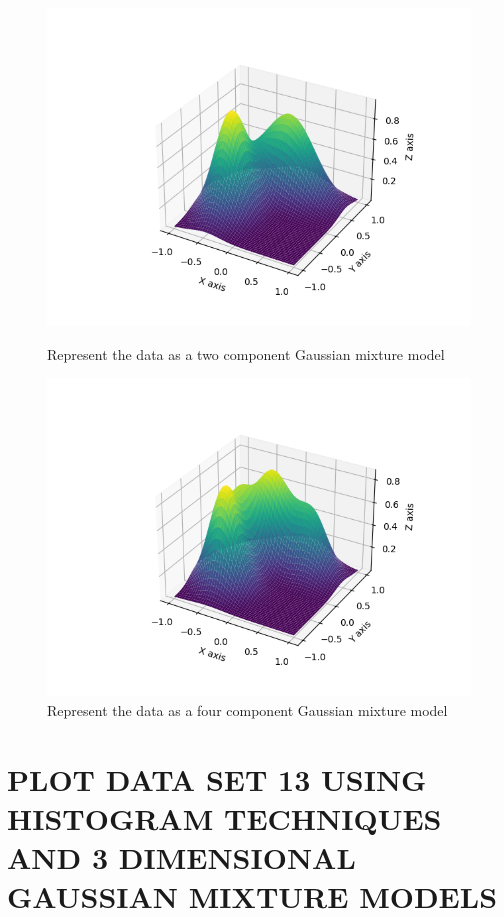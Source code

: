 \documentclass{article}
\begin{document}
\begin{figure}[!htb]
\begin{minipage}{0.49\textwidth}
			\includegraphics[width=1\linewidth]{../q1to6pics/q6_2.png}
			\caption{Represent the data as a two component Gaussian mixture model}
	\end{minipage}\hfill
	\centering
	\begin{minipage}{0.49\textwidth}
			\centering
			\includegraphics[width=1\linewidth]{../q1to6pics/q6_4.png}
			\caption{Represent the data as a four component Gaussian mixture model}
	\end{minipage}\hfill
\end{figure}

\section{\MakeUppercase{Plot data set 13 using histogram techniques and 3 dimensional Gaussian mixture models}}
\end{document}
